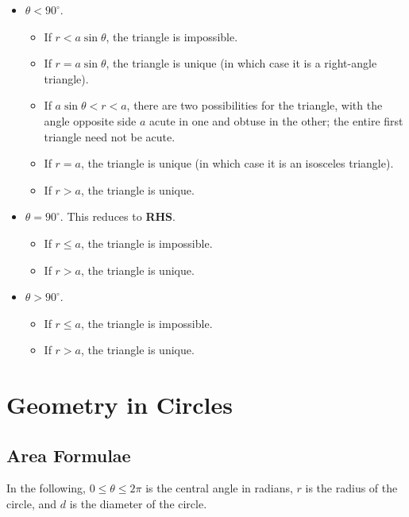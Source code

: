 \documentclass[11pt]{article}
\theoremstyle{definition}
\theoremstyle{remark}
\newcommand{\degree}{^{\circ}}
\begin{document}
\begin{itemize}
    \item \(\theta < 90\degree\).
    \begin{itemize}
        \item If \(r < a \sin \theta\), the triangle is impossible.
        \item If \(r = a \sin \theta\), the triangle is unique (in which case it is a right-angle triangle).
        \item If \(a \sin \theta < r < a\), there are two possibilities for the triangle, with the angle opposite side \(a\) acute in one and obtuse in the other; the entire first triangle need not be acute.
        \item If \(r = a\), the triangle is unique (in which case it is an isosceles triangle).
        \item If \(r > a\), the triangle is unique.
    \end{itemize}

    \item \(\theta = 90 \degree\). This reduces to \textbf{RHS}.
    \begin{itemize}
        \item If \(r \leq a\), the triangle is impossible.
        \item If \(r > a\), the triangle is unique.
    \end{itemize}

    \item \(\theta > 90 \degree\).
    \begin{itemize}
        \item If \(r \leq a\), the triangle is impossible.
        \item If \(r > a\), the triangle is unique.
    \end{itemize}
\end{itemize}

\section{Geometry in Circles}\label{tmua-3-section-003}
\subsection{Area Formulae}\label{tmua-3-subsection-004}

In the following, \(0\le\theta\le2\pi\) is the central angle in radians, \(r\) is the radius of the circle, and \(d\) is the diameter of the circle.
\end{document}
